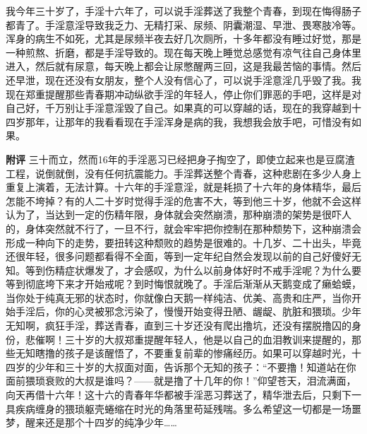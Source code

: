 \begin{case}
    我今年三十岁了，手淫十六年了，可以说手淫葬送了我整个青春，到现在悔得肠子都青了。手淫意淫导致我乏力、无精打采、尿频、阴囊潮湿、早泄、畏寒肢冷等。浑身的病生不如死，尤其是尿频半夜去好几次厕所，十多年都没有睡过好觉，那是一种煎熬、折磨，都是手淫导致的。现在每天晚上睡觉总感觉有凉气往自己身体里进入，然后就有尿意，每天晚上都会让尿憋醒两三回，这是我最苦恼的事情。然后还早泄，现在还没有女朋友，整个人没有信心了，可以说手淫意淫几乎毁了我。我现在郑重提醒那些青春期冲动纵欲手淫的年轻人，停止你们罪恶的手吧，这样是对自己好，千万别让手淫意淫毁了自己。如果真的可以穿越的话，现在的我穿越到十四岁那年，让那年的我看看现在手淫浑身是病的我，我想我会放手吧，可惜没有如果。

    \textbf{附评} 三十而立，然而16年的手淫恶习已经把身子掏空了，即使立起来也是豆腐渣工程，说倒就倒，没有任何抗震能力。手淫葬送整个青春，这种悲剧在多少人身上重复上演着，无法计算。十六年的手淫意淫，就是耗损了十六年的身体精华，最后怎能不垮掉？有的人二十岁时觉得手淫的危害不大，等到他三十岁，他就不会这样认为了，当达到一定的伤精年限，身体就会突然崩溃，那种崩溃的架势是很吓人的，身体突然就不行了，一旦不行，就会牢牢把你控制在那种颓势下，这种崩溃会形成一种向下的走势，要扭转这种颓败的趋势是很难的。十几岁、二十出头，毕竟还很年轻，很多问题都看得不全面，等到一定年纪自然会发现以前的自己好傻好无知。等到伤精症状爆发了，才会感叹，为什么以前身体好时不戒手淫呢？为什么要等到彻底垮下来才开始戒呢？到时悔恨就晚了。手淫后渐渐从天鹅变成了癞蛤蟆，当你处于纯真无邪的状态时，你就像白天鹅一样纯洁、优美、高贵和庄严，当你开始手淫后，你的心灵被邪念污染了，慢慢开始变得丑陋、龌龊、肮脏和猥琐。少年无知啊，疯狂手淫，葬送青春，直到三十岁还没有爬出撸坑，还没有摆脱撸囚的身份，悲催啊！三十岁的大叔郑重提醒年轻人，他是以自己的血泪教训来提醒的，那些无知瞎撸的孩子是该醒悟了，不要重复前辈的惨痛经历。如果可以穿越时光，十四岁的少年和三十岁的大叔面对面，告诉那个无知的孩子：“不要撸！知道站在你面前猥琐衰败的大叔是谁吗？——就是撸了十几年的你！”仰望苍天，泪流满面，向天再借十六年！这十六的青春年华都被手淫恶习葬送了，精华泄去后，只剩下一具疾病缠身的猥琐躯壳蜷缩在时光的角落里苟延残喘。多么希望这一切都是一场噩梦，醒来还是那个十四岁的纯净少年……
\end{case}

